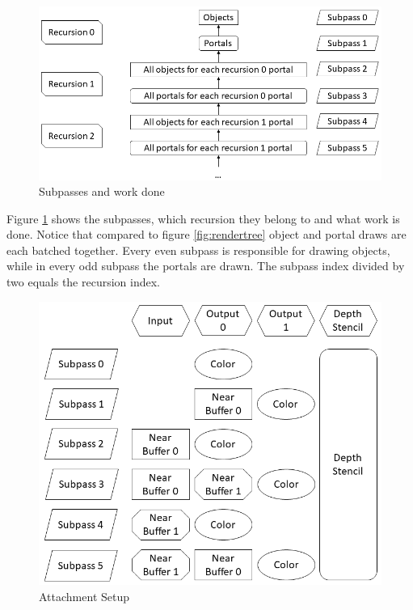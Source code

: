 \begin{figure}[h]
	\includegraphics[width=\linewidth]{images/renderpasses.png}
	\caption{Subpasses and work done}
	\label{fig:renderpasses}
\end{figure}


Figure \ref{fig:renderpasses} shows the subpasses, which recursion they belong to and what work is done. Notice that compared to figure \ref{fig:rendertree} object and portal draws are each batched together. Every even subpass is responsible for drawing objects, while in every odd subpass the portals are drawn. The subpass index divided by two equals the recursion index. 

\begin{figure}[h]
	\includegraphics[width=\linewidth]{images/attachmentsetup.png}
	\caption{Attachment Setup}
	\label{fig:attachments}
\end{figure}

